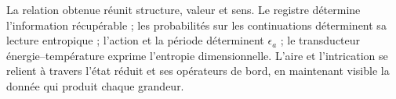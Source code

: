 La relation obtenue réunit structure, valeur et sens. Le registre
détermine l’information récupérable ; les probabilités sur les
continuations déterminent sa lecture entropique ; l’action et la période
déterminent \(\epsilon_a\) ; le transducteur énergie--température
exprime l’entropie dimensionnelle. L’aire et l’intrication se
relient à travers l’état réduit et ses opérateurs de bord,
en maintenant visible la donnée qui produit chaque grandeur.

